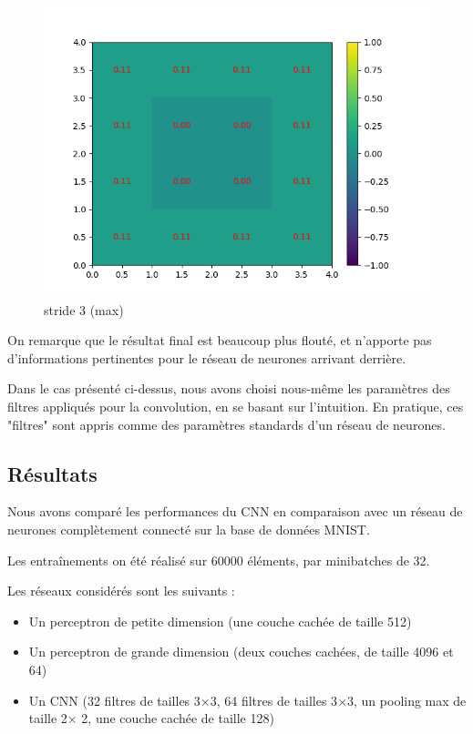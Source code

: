 \begin{figure}[h]
        \includegraphics[width=\textwidth]{img/cnn_exemple/square/stride_3_max.png}
        \caption{stride 3 (max)}
    \endminipage
\end{figure}

On remarque que le résultat final est beaucoup plus flouté, et n'apporte pas d'informations pertinentes pour le réseau de 
neurones arrivant derrière.

Dans le cas présenté ci-dessus, nous avons choisi nous-même les paramètres des filtres appliqués pour la convolution,
en se basant sur l'intuition.
En pratique, ces "filtres" sont appris comme des paramètres standards d'un réseau de neurones.

\subsection{Résultats}

Nous avons comparé les performances du CNN en comparaison avec un réseau de neurones complètement connecté sur la base de 
données MNIST.

Les entraînements on été réalisé sur 60000 éléments, par minibatches de 32.

Les réseaux considérés sont les suivants : 
\begin{itemize}
    \item Un perceptron de petite dimension (une couche cachée de taille 512)
    \item Un perceptron de grande dimension (deux couches cachées, de taille 4096 et 64)
    \item Un CNN (32 filtres de tailles 3$\times$3, 64 filtres de tailles 3$\times$3, un pooling max de taille 2$\times$ 2, une couche cachée de taille 128)
\end{itemize}

